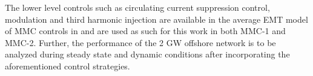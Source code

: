 The lower level controls such as circulating current suppression control, modulation and third harmonic injection %
are available in the average \gls{EMT} model of \gls{MMC} controls in \cite{vrana2013cigre} and are used as such for this work in both \gls{MMC}-1 and \gls{MMC}-2. Further, the performance of the 2 GW offshore network is to be analyzed during steady state and dynamic conditions after incorporating the aforementioned control strategies.

